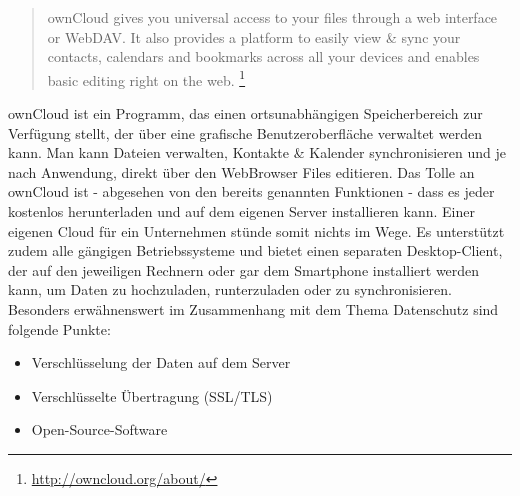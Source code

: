 \begin{quote}
ownCloud gives you universal access to your files through a web interface or WebDAV. It also provides a platform to easily view \& sync your contacts, calendars and bookmarks across all your devices and enables basic editing right on the web.
\footnote{\url{http://owncloud.org/about/}}	
\end{quote}

ownCloud ist ein Programm, das einen ortsunabhängigen Speicherbereich zur Verfügung stellt, der über eine grafische Benutzeroberfläche verwaltet werden kann. Man kann Dateien verwalten, Kontakte \& Kalender synchronisieren und je nach Anwendung, direkt über den WebBrowser Files editieren. Das Tolle an ownCloud ist - abgesehen von den bereits genannten Funktionen - dass es jeder kostenlos herunterladen und auf dem eigenen Server installieren kann. Einer eigenen Cloud für ein Unternehmen stünde somit nichts im Wege. Es unterstützt zudem alle gängigen Betriebssysteme und bietet einen separaten Desktop-Client, der auf den jeweiligen Rechnern oder gar dem Smartphone installiert werden kann, um Daten zu hochzuladen, runterzuladen oder zu synchronisieren.
Besonders erwähnenswert im Zusammenhang mit dem Thema Datenschutz sind folgende Punkte:

\begin{itemize}
\item Verschlüsselung der Daten auf dem Server
\item Verschlüsselte Übertragung (SSL/TLS)
\item Open-Source-Software
\end{itemize}

